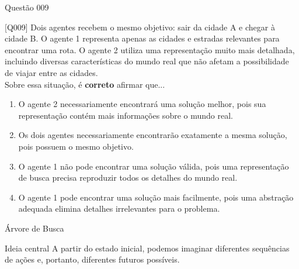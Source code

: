 \documentclass[xcolor=dvipsnames,table]{beamer}
\begin{document}
{\logo{}
\begin{frame}{Questão 009}
\small
\begin{block}{[Q009]}
Dois agentes recebem o mesmo objetivo: sair da cidade A e chegar à cidade B. O agente 1 representa apenas as cidades e estradas relevantes para encontrar uma rota. O agente 2 utiliza uma representação muito mais detalhada, incluindo diversas características do mundo real que não afetam a possibilidade de viajar entre as cidades. \\Sobre essa situação, é {\bf correto} afirmar que...
\end{block}

\begin{enumerate}[label=(\Alph*)]
    \item O agente 2 necessariamente encontrará uma solução melhor, pois sua representação contém mais informações sobre o mundo real.
    
    \item Os dois agentes necessariamente encontrarão exatamente a mesma solução, pois possuem o mesmo objetivo.
    
    \item O agente 1 não pode encontrar uma solução válida, pois uma representação de busca precisa reproduzir todos os detalhes do mundo real.
    
	 \item O agente 1 pode encontrar uma solução mais facilmente, pois uma abstração adequada elimina detalhes irrelevantes para o problema.
\end{enumerate}

\end{frame}
}

\begin{frame}{Árvore de Busca}
\begin{block}{Ideia central}
A partir do estado inicial, podemos imaginar diferentes sequências de ações e, portanto, diferentes futuros possíveis.
\end{block}

\begin{center}
\end{center}

\end{frame}
\end{document}
